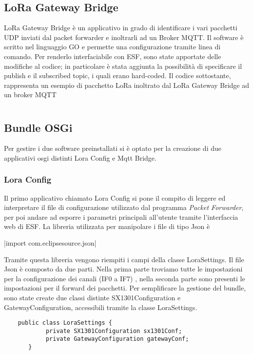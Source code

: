 \subsection{LoRa Gateway Bridge}
LoRa Gateway Bridge è un applicativo in grado di identificare i vari pacchetti UDP inviati
dal packet forwarder e inoltrarli ad un Broker MQTT. 
Il software è scritto nel linguaggio GO e permette una configurazione tramite
linea di comando.  Per renderlo interfaciabile con ESF, sono state apportate delle 
modifiche al codice; in particolare è stata aggiunta la possibilità di
specificare il publish e il subscribed topic, i quali erano hard-coded.
Il codice sottostante, rappresenta un esempio di pacchetto LoRa inoltrato dal
LoRa Gateway Bridge ad un broker MQTT
\inputminted[mathescape, gobble=2, frame=lines, linenos=true
framesep=2mm, firstline=1,lastline=23]{json}{Code_Files/message.json}

\subsection{Bundle OSGi}
Per gestire i due software preinstallati si è optato per la creazione di due
applicativi osgi distinti Lora Config e Mqtt Bridge.

\subsubsection{Lora Config}
Il primo applicativo chiamato Lora Config si pone il compito di leggere ed
interpretare il file di configurazione utilizzato dal programma \emph{Packet
Forwarder}, per poi andare ad esporre i parametri principali all'utente tramite
l'interfaccia web di ESF.
La libreria utilizzata per manipolare i file di tipo Json è 

|import com.eclipsesource.json|

Tramite questa libreria vengono riempiti i campi della classe LoraSettings. Il file
Json è composto da due parti. Nella prima parte
troviamo tutte le impostazioni per la configurazione dei canali (IF0 a IF7)
, nella seconda
parte sono presenti le impostazioni per il forward dei pacchetti. 
Per semplificare la gestione del bundle, sono state create due classi distinte
SX1301Configuration e GatewayConfiguration, accessibili tramite la classe LoraSettings.

\begin{verbatim}
    public class LoraSettings {
            private SX1301Configuration sx1301Conf;
            private GatewayConfiguration gatewayConf;
       } 
\end{verbatim}

